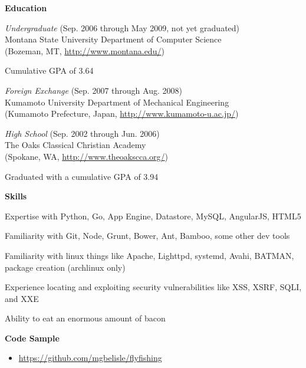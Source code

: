 \documentclass[11pt, a4paper]{article}
\begin{document}
\textbf{Education}
\begin{itemize*}
  \item \emph{Undergraduate} (Sep. 2006 through May 2009, not yet graduated)\\
    Montana State University Department of Computer Science\\
    (Bozeman, MT, \url{http://www.montana.edu/})
    \begin{itemize*}
      \item Cumulative GPA of 3.64
    \end{itemize*}
  \item \emph{Foreign Exchange} (Sep. 2007 through Aug. 2008) \\ Kumamoto University Department of Mechanical Engineering \\(Kumamoto Prefecture, Japan, \url{http://www.kumamoto-u.ac.jp/})
  \item \emph{High School} (Sep. 2002 through Jun. 2006)\\
    The Oaks Classical Christian Academy\\
    (Spokane, WA, \url{http://www.theoakscca.org/})
    \begin{itemize*}
      \item Graduated with a cumulative GPA of 3.94
    \end{itemize*}
\end{itemize*}
\textbf{Skills}
\begin{itemize*}
  \item Expertise with Python, Go, App Engine, Datastore, MySQL, AngularJS, HTML5
  \item Familiarity with Git, Node, Grunt, Bower, Ant, Bamboo, some other dev tools
  \item Familiarity with linux things like Apache, Lighttpd, systemd, Avahi, BATMAN, package creation (archlinux only)
  \item Experience locating and exploiting security vulnerabilities like XSS, XSRF, SQLI, and XXE
  \item Ability to eat an enormous amount of bacon
\end{itemize*}
\textbf{Code Sample}
\begin{itemize}
  \item[] \url{https://github.com/mgbelisle/flyfishing}
\end{itemize}
\end{document}

